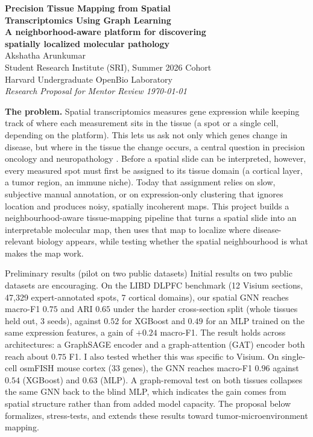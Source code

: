\documentclass[11pt]{article}
\begin{document}
\begin{center}
  {\LARGE\bfseries\color{sriblue} Precision Tissue Mapping from Spatial\\ Transcriptomics Using Graph Learning}\\[4pt]
  {\large\bfseries\color{sriblue!80!black} A neighborhood-aware platform for discovering\\ spatially localized molecular pathology}\\[10pt]
  {\large Akshatha Arunkumar}\\[2pt]
  {\small Student Research Institute (SRI), Summer 2026 Cohort \\
  Harvard Undergraduate OpenBio Laboratory}\\[2pt]
  {\small\itshape Research Proposal for Mentor Review \quad\textbar\quad \today}
\end{center}

\vspace{2pt}
\begin{problembox}
\textbf{The problem.} Spatial transcriptomics measures gene expression while
keeping track of where each measurement sits in the tissue (a spot or a single
cell, depending on the platform). This lets us ask not only which genes change in
disease, but where in the tissue the change occurs, a central question in
precision oncology and neuropathology \cite{cilento2024}. Before a spatial slide
can be interpreted, however, every measured spot must first be assigned to its
tissue domain (a cortical layer, a tumor region, an immune niche). Today that
assignment relies on slow, subjective manual annotation, or on expression-only
clustering that ignores location and produces noisy, spatially incoherent maps.
This project builds a neighbourhood-aware tissue-mapping pipeline that turns a
spatial slide into an interpretable molecular map, then uses that map to localize
where disease-relevant biology appears, while testing whether the spatial
neighbourhood is what makes the map work.
\end{problembox}

\begin{aimbox}{Preliminary results (pilot on two public datasets)}
Initial results on two public datasets are encouraging. On the LIBD DLPFC
benchmark (12 Visium sections, 47{,}329 expert-annotated spots, 7 cortical
domains), our spatial GNN reaches macro-F1 $0.75$ and ARI $0.65$ under the harder
cross-section split (whole tissues held out, 3 seeds), against $0.52$ for XGBoost
and $0.49$ for an MLP trained on the same expression features, a gain of $+0.24$
macro-F1. The result holds across architectures: a GraphSAGE encoder
and a graph-attention (GAT) encoder both reach about $0.75$ F1. I also tested
whether this was specific to Visium. On single-cell osmFISH mouse cortex (33 genes), the
GNN reaches macro-F1 $0.96$ against $0.54$ (XGBoost) and $0.63$ (MLP). A
graph-removal test on both tissues collapses the same GNN back to the blind MLP,
which indicates the gain comes from spatial structure rather than from added
model capacity. The proposal below formalizes, stress-tests, and extends these
results toward tumor-microenvironment mapping.
\end{aimbox}
\end{document}

